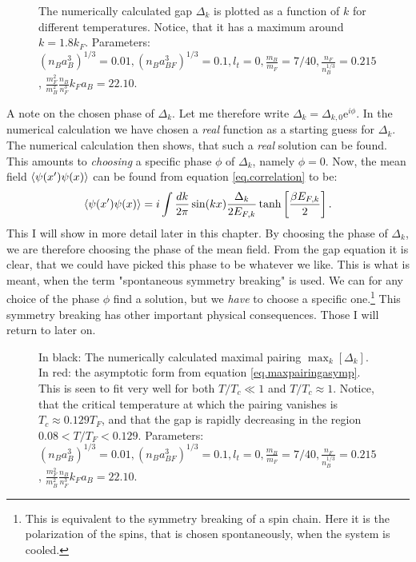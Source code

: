 \begin{figure} 
\begin{center}  
  
\caption{The numerically calculated gap $\Delta_k$ is plotted as a function of $k$ for different temperatures. Notice, that it has a maximum around $k = 1.8 k_F$. Parameters: $(n_Ba_B^3)^{1/3} = 0.01, (n_Ba_{BF}^3)^{1/3} = 0.1, l_t = 0, \frac{m_B}{m_F} = 7/40, \frac{n_F}{n_B^{1/3}} = 0.215$, $\frac{m_F^2}{m_B^2}\frac{n_B}{n_F^3} k_Fa_B = 22.10$. }  
\label{fig.Deltakkdepend}  
\end{center}    
\end{figure}

A note on the chosen phase of $\Delta_k$. Let me therefore write $\Delta_k = \Delta_{k,0}\text{e}^{i\phi}$. In the numerical calculation we have chosen a \textit{real} function as a starting guess for $\Delta_k$. The numerical calculation then shows, that such a \textit{real} solution can be found. This amounts to \textit{choosing} a specific phase $\phi$ of $\Delta_k$, namely $\phi = 0$. Now, the mean field $\braket{\psi(x')\psi(x)}$ can be found from equation \ref{eq.correlation} to be:
\begin{equation}
\braket{\psi(x')\psi(x)} = i\int \frac{dk}{2\pi} \sin(kx)\frac{\Delta_k}{2E_{F,k}}\tanh\left[\frac{ \beta E_{F,k} }{2}\right]. \nonumber
\end{equation}
This I will show in more detail later in this chapter. By choosing the phase of $\Delta_k$, we are therefore choosing the phase of the mean field. From the gap equation it is clear, that we could have picked this phase to be whatever we like. This is what is meant, when the term "spontaneous symmetry breaking" is used. We can for any choice of the phase $\phi$ find a solution, but we \textit{have} to choose a specific one.\footnote{This is equivalent to the symmetry breaking of a spin chain. Here it is the polarization of the spins, that is chosen spontaneously, when the system is cooled.} This symmetry breaking has other important physical consequences. Those I will return to later on. 

\begin{figure} 
\begin{center}  
  
\caption{In black: The numerically calculated maximal pairing $\max_k[\Delta_k]$. In red: the asymptotic form from equation \eqref{eq.maxpairingasymp}. This is seen to fit very well for both $T/T_c \ll 1$ and $T/T_c \approx 1$. Notice, that the critical temperature at which the pairing vanishes is $T_c \approx 0.129 T_F$, and that the gap is rapidly decreasing in the region $0.08< T/T_F < 0.129$. Parameters: $(n_Ba_B^3)^{1/3} = 0.01, (n_Ba_{BF}^3)^{1/3} = 0.1, l_t = 0, \frac{m_B}{m_F} = 7/40, \frac{n_F}{n_B^{1/3}} = 0.215$, $\frac{m_F^2}{m_B^2}\frac{n_B}{n_F^3} k_Fa_B = 22.10$. }  
\label{fig.maxkDeltakTdepend}  
\end{center}    
\end{figure}

